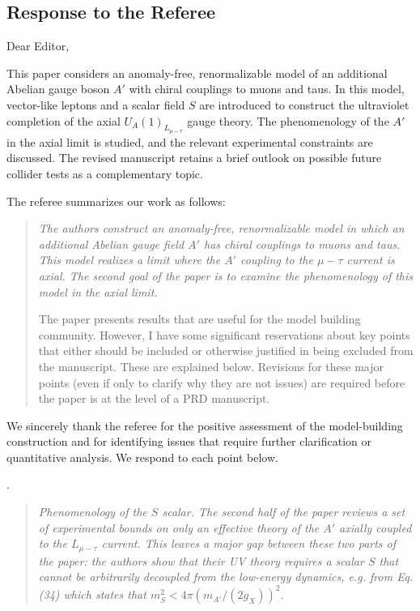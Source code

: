 \documentclass[12pt,a4paper]{article}
\begin{document}
\subsection*{Response to the Referee}

\noindent Dear Editor,

This paper considers an anomaly-free, renormalizable model of an additional Abelian
gauge boson \(A'\) with chiral couplings to muons and taus. In this model, vector-like
leptons and a scalar field \(S\) are introduced to construct the ultraviolet completion
of the axial \(U_A(1)_{L_{\mu-\tau}}\) gauge theory. The phenomenology of the \(A'\) in
the axial limit is studied, and the relevant experimental constraints are discussed.
The revised manuscript retains a brief outlook on possible future collider tests as a complementary topic.

The referee summarizes our work as follows:

\begin{quote}
\itshape
The authors construct an anomaly-free, renormalizable model in which an additional Abelian gauge field \(A'\) has chiral couplings to muons and taus. This model realizes a limit where the \(A'\) coupling to the \(\mu-\tau\) current is axial. The second goal of the paper is to examine the phenomenology of this model in the axial limit.

The paper presents results that are useful for the model building community. However, I have some significant reservations about key points that either should be included or otherwise justified in being excluded from the manuscript. These are explained below. Revisions for these major points (even if only to clarify why they are not issues) are required before the paper is at the level of a PRD manuscript.
\end{quote}

We sincerely thank the referee for the positive assessment of the model-building construction and for identifying issues that require further clarification or quantitative analysis. We respond to each point below.

\medskip
{}. \begin{quote}\itshape
Phenomenology of the \(S\) scalar. The second half of the paper reviews a set of experimental bounds on only an effective theory of the \(A'\) axially coupled to the \(L_{\mu-\tau}\) current. This leaves a major gap between these two parts of the paper: the authors show that their UV theory requires a scalar \(S\) that cannot be arbitrarily decoupled from the low-energy dynamics, e.g. from Eq. (34) which states that \(m_S^2 < 4\pi\left(m_{A'}/(2g_X)\right)^2\).\end{quote}
\end{document}
